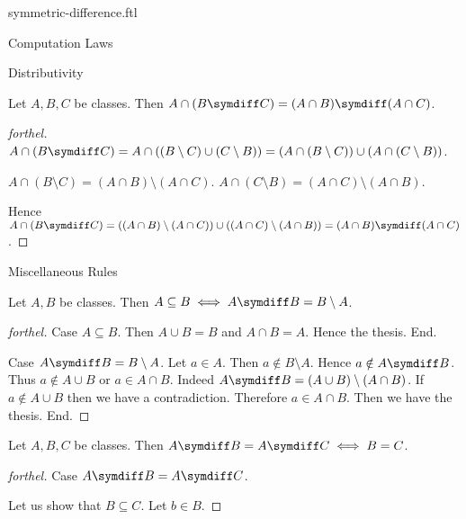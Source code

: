 \documentclass{naproche-library}
\begin{document}
\begin{smodule}[title=Symmetric Difference]{symmetric-difference.ftl}
\begin{sfragment}{Computation Laws}
  \begin{sfragment}{Distributivity}
    \begin{proposition}[forthel,id=FOUNDATIONS_03_4119141910839296]
      Let $A, B, C$ be classes.
      Then $A \cap (B \symdiff C) = (A \cap B) \symdiff (A \cap C)$.
    \end{proposition}
    \begin{proof}[forthel]
      $A \cap (B \symdiff C)
        = A \cap ((B \setminus C) \cup (C \setminus B))
        = (A \cap (B \setminus C)) \cup (A \cap (C \setminus B))$.

      $A \cap (B \setminus C) = (A \cap B) \setminus (A \cap C)$.
      $A \cap (C \setminus B) = (A \cap C) \setminus (A \cap B)$.

      Hence $A \cap (B \symdiff C)
        = ((A \cap B) \setminus (A \cap C)) \cup ((A \cap C) \setminus (A \cap B))
        = (A \cap B) \symdiff (A \cap C)$.
    \end{proof}
  \end{sfragment}

  \begin{sfragment}{Miscellaneous Rules}
    \begin{proposition}[forthel,id=FOUNDATIONS_03_7383417205293056]
      Let $A, B$ be classes.
      Then $A \subseteq B \iff A \symdiff B = B \setminus A$.
    \end{proposition}
    \begin{proof}[forthel]
      Case $A \subseteq B$.
        Then $A \cup B = B$ and $A \cap B = A$.
        Hence the thesis.
      End.

      Case $A \symdiff B = B \setminus A$.
        Let $a \in A$.
        Then $a \notin B \setminus A$.
        Hence $a \notin A \symdiff B$.
        Thus $a \notin A \cup B$ or $a \in A \cap B$.
        Indeed $A \symdiff B = (A \cup B) \setminus (A \cap B)$.
        If $a \notin A \cup B$ then we have a contradiction.
        Therefore $a \in A \cap B$.
        Then we have the thesis.
      End.
    \end{proof}

    \begin{proposition}[forthel,id=FOUNDATIONS_03_4490230937681920]
      Let $A, B, C$ be classes.
      Then $A \symdiff B = A \symdiff C \iff B = C$.
    \end{proposition}
    \begin{proof}[forthel]
      Case $A \symdiff B = A \symdiff C$.

        Let us show that $B \subseteq C$.
          Let $b \in B$.


\end{proof}
\end{sfragment}
\end{sfragment}
\end{smodule}
\end{document}
